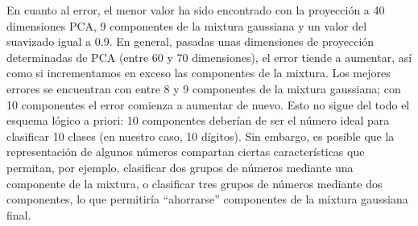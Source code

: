 \documentclass[a4paper]{article}
\begin{document}
\quad En cuanto al error, el menor valor ha sido encontrado con la proyección a 40 dimensiones PCA, 9 componentes de la mixtura gaussiana y un valor del suavizado igual a 0.9. En general, pasadas unas dimensiones de proyección determinadas de PCA (entre 60 y 70 dimensiones), el error tiende a aumentar, así como si incrementamos en exceso las componentes de la mixtura. Los mejores errores se encuentran con entre 8 y 9 componentes de la mixtura gaussiana; con 10 componentes el error comienza a aumentar de nuevo. Esto no sigue del todo el esquema lógico a priori: 10 componentes deberían de ser el número ideal para clasificar 10 clases (en nuestro caso, 10 dígitos). Sin embargo, es posible que la representación de algunos números compartan ciertas características que permitan, por ejemplo, clasificar dos grupos de números mediante una componente de la mixtura, o clasificar tres grupos de números mediante dos componentes, lo que permitiría “ahorrarse” componentes de la mixtura gaussiana final.
\end{document}
